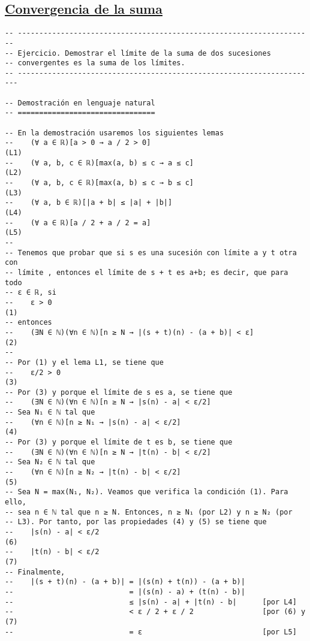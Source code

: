 \subsection{\href{./src/Logica/Convergencia\_de\_la\_suma.lean}{Convergencia de la suma}}
\label{sec:org1ef01ec}
\begin{verbatim}
-- ---------------------------------------------------------------------
-- Ejercicio. Demostrar el límite de la suma de dos sucesiones
-- convergentes es la suma de los límites.
-- ----------------------------------------------------------------------

-- Demostración en lenguaje natural
-- ================================

-- En la demostración usaremos los siguientes lemas
--    (∀ a ∈ ℝ)[a > 0 → a / 2 > 0]                                   (L1)
--    (∀ a, b, c ∈ ℝ)[max(a, b) ≤ c → a ≤ c]                         (L2)
--    (∀ a, b, c ∈ ℝ)[max(a, b) ≤ c → b ≤ c]                         (L3)
--    (∀ a, b ∈ ℝ)[|a + b| ≤ |a| + |b|]                              (L4)
--    (∀ a ∈ ℝ)[a / 2 + a / 2 = a]                                   (L5)
--
-- Tenemos que probar que si s es una sucesión con límite a y t otra con
-- límite , entonces el límite de s + t es a+b; es decir, que para todo
-- ε ∈ ℝ, si
--    ε > 0                                                          (1)
-- entonces
--    (∃N ∈ ℕ)(∀n ∈ ℕ)[n ≥ N → |(s + t)(n) - (a + b)| < ε]           (2)
--
-- Por (1) y el lema L1, se tiene que
--    ε/2 > 0                                                        (3)
-- Por (3) y porque el límite de s es a, se tiene que
--    (∃N ∈ ℕ)(∀n ∈ ℕ)[n ≥ N → |s(n) - a| < ε/2]
-- Sea N₁ ∈ ℕ tal que
--    (∀n ∈ ℕ)[n ≥ N₁ → |s(n) - a| < ε/2]                            (4)
-- Por (3) y porque el límite de t es b, se tiene que
--    (∃N ∈ ℕ)(∀n ∈ ℕ)[n ≥ N → |t(n) - b| < ε/2]
-- Sea N₂ ∈ ℕ tal que
--    (∀n ∈ ℕ)[n ≥ N₂ → |t(n) - b| < ε/2]                            (5)
-- Sea N = max(N₁, N₂). Veamos que verifica la condición (1). Para ello,
-- sea n ∈ ℕ tal que n ≥ N. Entonces, n ≥ N₁ (por L2) y n ≥ N₂ (por
-- L3). Por tanto, por las propiedades (4) y (5) se tiene que
--    |s(n) - a| < ε/2                                               (6)
--    |t(n) - b| < ε/2                                               (7)
-- Finalmente,
--    |(s + t)(n) - (a + b)| = |(s(n) + t(n)) - (a + b)|
--                           = |(s(n) - a) + (t(n) - b)|
--                           ≤ |s(n) - a| + |t(n) - b|      [por L4]
--                           < ε / 2 + ε / 2                [por (6) y (7)
--                           = ε                            [por L5]


\end{verbatim}
